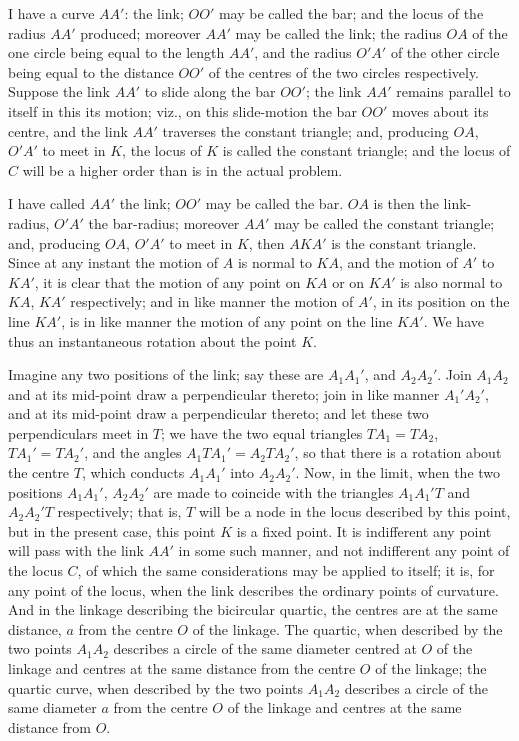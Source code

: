 \documentclass[11pt,a4paper]{article}
\begin{document}
\medskip

I have a curve $AA'$: the link; $OO'$ may be called the bar; and the locus of the
radius $A A'$ produced; moreover $AA'$ may be called the link; the radius $OA$ of
the one circle being equal to the length $AA'$, and the radius $O'A'$ of the other
circle being equal to the distance $OO'$ of the centres of the two circles
respectively. Suppose the link $AA'$ to slide along the bar $OO'$; the link $AA'$
remains parallel to itself in this its motion; viz., on this slide-motion the bar
$OO'$ moves about its centre, and the link $AA'$ traverses the constant triangle;
and, producing $OA$, $O'A'$ to meet in $K$, the locus of $K$ is called the
constant triangle; and the locus of $C$ will be a higher order than is in the actual
problem.

\medskip

I have called $AA'$ the link; $OO'$ may be called the bar. $OA$ is then the
link-radius, $O'A'$ the bar-radius; moreover $AA'$ may be called the constant
triangle; and, producing $OA$, $O'A'$ to meet in $K$, then $AKA'$ is the constant
triangle. Since at any instant the motion of $A$ is normal to $KA$, and the motion
of $A'$ to $KA'$, it is clear that the motion of any point on $KA$ or on $KA'$ is
also normal to $KA$, $KA'$ respectively; and in like manner the motion of $A'$, in
its position on the line $KA'$, is in like manner the motion of any point on the
line $KA'$. We have thus an instantaneous rotation about the point $K$.

\medskip

Imagine any two positions of the link; say these are $A_1A_1'$, and $A_2A_2'$. Join
$A_1A_2$ and at its mid-point draw a perpendicular thereto; join in like manner
$A_1'A_2'$, and at its mid-point draw a perpendicular thereto; and let these two
perpendiculars meet in $T$; we have the two equal triangles $TA_1 = TA_2$, $TA_1' = TA_2'$,
and the angles $A_1TA_1' = A_2TA_2'$, so that there is a rotation about the centre
$T$, which conducts $A_1A_1'$ into $A_2A_2'$. Now, in the limit, when the two
positions $A_1A_1'$, $A_2A_2'$ are made to coincide with the triangles $A_1A_1'T$
and $A_2A_2'T$ respectively; that is, $T$ will be a node in the locus described by
this point, but in the present case, this point $K$ is a fixed point. It is
indifferent any point will pass with the link $A A'$ in some such manner, and not
indifferent any point of the locus $C$, of which the same considerations may be
applied to itself; it is, for any point of the locus, when the link describes the
ordinary points of curvature. And in the linkage describing the bicircular quartic,
the centres are at the same distance, $a$ from the centre $O$ of the linkage. The
quartic, when described by the two points $A_1A_2$ describes a circle of the same
diameter centred at $O$ of the linkage and centres at the same distance from the
centre $O$ of the linkage; the quartic curve, when described by the two points $A_1A_2$
describes a circle of the same diameter $a$ from the centre $O$ of the linkage and
centres at the same distance from $O$.
\end{document}
